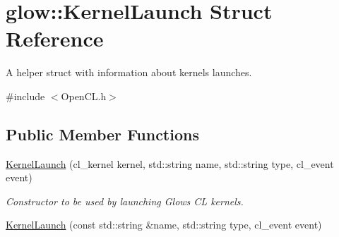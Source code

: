 \hypertarget{structglow_1_1_kernel_launch}{}\section{glow\+:\+:Kernel\+Launch Struct Reference}
\label{structglow_1_1_kernel_launch}


A helper struct with information about kernels launches.  




{\ttfamily \#include $<$Open\+C\+L.\+h$>$}

\subsection*{Public Member Functions}
\begin{DoxyCompactItemize}
\item 
\mbox{\label{structglow_1_1_kernel_launch_a5bafc098c9cf71841216482f455ed304}} 
\hyperlink{structglow_1_1_kernel_launch_a5bafc098c9cf71841216482f455ed304}{Kernel\+Launch} (cl\+\_\+kernel kernel, std\+::string name, std\+::string type, cl\+\_\+event event)
\begin{DoxyCompactList}\small\item\em Constructor to be used by launching Glow\textquotesingle{}s CL kernels. \end{DoxyCompactList}\item 
\hyperlink{structglow_1_1_kernel_launch_a48a8021551c969a239135dcf3ea403d5}{Kernel\+Launch} (const std\+::string \&name, std\+::string type, cl\+\_\+event event)
\end{DoxyCompactItemize}
